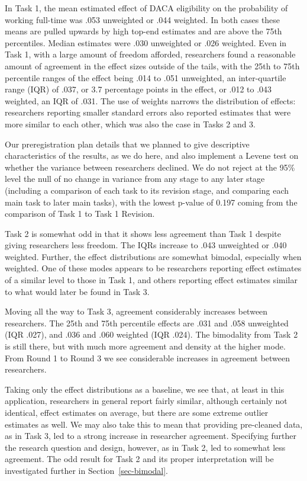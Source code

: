 \documentclass[
  letterpaper,
  DIV=11,
  numbers=noendperiod]{scrartcl}
\begin{document}
In Task 1, the mean estimated effect of DACA eligibility on the
probability of working full-time was .053 unweighted or .044 weighted.
In both cases these means are pulled upwards by high top-end estimates
and are above the 75th percentiles. Median estimates were .030
unweighted or .026 weighted. Even in Task 1, with a large amount of
freedom afforded, researchers found a reasonable amount of agreement in
the effect sizes outside of the tails, with the 25th to 75th percentile
ranges of the effect being .014 to .051 unweighted, an inter-quartile
range (IQR) of .037, or 3.7 percentage points in the effect, or .012 to
.043 weighted, an IQR of .031. The use of weights narrows the
distribution of effects: researchers reporting smaller standard errors
also reported estimates that were more similar to each other, which was
also the case in Tasks 2 and 3.

Our preregistration plan details that we planned to give descriptive
characteristics of the results, as we do here, and also implement a
Levene test on whether the variance between researchers declined. We do
not reject at the 95\% level the null of no change in variance from any
stage to any later stage (including a comparison of each task to its
revision stage, and comparing each main task to later main tasks), with
the lowest p-value of 0.197 coming from the comparison of Task 1 to Task
1 Revision.

Task 2 is somewhat odd in that it shows less agreement than Task 1
despite giving researchers less freedom. The IQRs increase to .043
unweighted or .040 weighted. Further, the effect distributions are
somewhat bimodal, especially when weighted. One of these modes appears
to be researchers reporting effect estimates of a similar level to those
in Task 1, and others reporting effect estimates similar to what would
later be found in Task 3.

Moving all the way to Task 3, agreement considerably increases between
researchers. The 25th and 75th percentile effects are .031 and .058
unweighted (IQR .027), and .036 and .060 weighted (IQR .024). The
bimodality from Task 2 is still there, but with much more agreement and
density at the higher mode. From Round 1 to Round 3 we see considerable
increases in agreement between researchers.

Taking only the effect distributions as a baseline, we see that, at
least in this application, researchers in general report fairly similar,
although certainly not identical, effect estimates on average, but there
are some extreme outlier estimates as well. We may also take this to
mean that providing pre-cleaned data, as in Task 3, led to a strong
increase in researcher agreement. Specifying further the research
question and design, however, as in Task 2, led to somewhat less
agreement. The odd result for Task 2 and its proper interpretation will
be investigated further in Section~\ref{sec-bimodal}.
\end{document}

